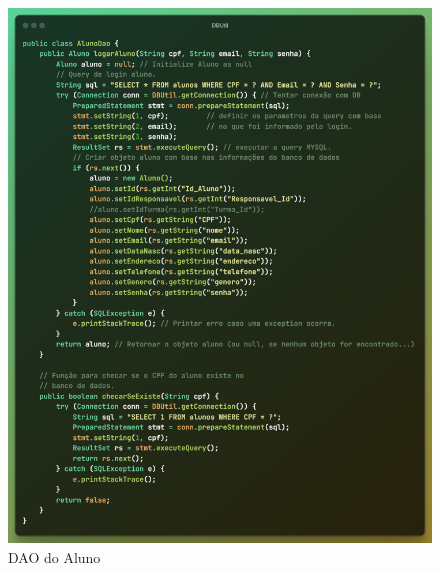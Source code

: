 \documentclass[main.tex]{subfiles}
\begin{document}
\begin{figure}[H]
    \centering
    \includegraphics[scale=0.63]{imagens/code_scrs/3-loginaluno}
    \caption{DAO do Aluno}
\end{figure}
\end{document}
